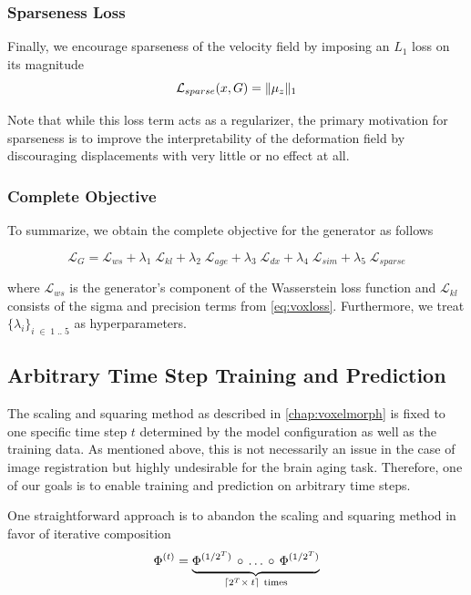 \subsubsection*{Sparseness Loss}
Finally, we encourage sparseness of the velocity field by imposing an $L_1$ loss on its magnitude
\begin{equation}
	\mathcal{L}_{sparse}( x, G ) = \lVert\mu_z\rVert_1
\end{equation}

Note that while this loss term acts as a regularizer, the primary motivation for sparseness is to improve the interpretability of the deformation field by discouraging displacements with very little or no effect at all.

\subsubsection*{Complete Objective}
To summarize, we obtain the complete objective for the generator as follows

\begin{equation}
	\mathcal{L}_G =
		\mathcal{L}_{ws} +
		\lambda_{1} \; \mathcal{L}_{kl} +
		\lambda_{2} \; \mathcal{L}_{age} + 
		\lambda_{3} \; \mathcal{L}_{dx} + 
		\lambda_{4} \; \mathcal{L}_{sim} + 
		\lambda_{5} \; \mathcal{L}_{sparse}
\end{equation}

where $\mathcal{L}_{ws}$ is the generator's component of the Wasserstein loss function and $\mathcal{L}_{kl}$ consists of the sigma and precision terms from \autoref{eq:voxloss}. Furthermore, we treat $ \{ \lambda_i \}_{i\;\in\;1\;..\;5}$ as hyperparameters.

\subsection{Arbitrary Time Step Training and Prediction} \label{sec:adaarbtimestep}
The scaling and squaring method as described in \autoref{chap:voxelmorph} is fixed to one specific time step $t$ determined by the model configuration as well as the training data. As mentioned above, this is not necessarily an issue in the case of image registration but highly undesirable for the brain aging task. Therefore, one of our goals is to enable training and prediction on arbitrary time steps.

One straightforward approach is to abandon the scaling and squaring method in favor of iterative composition
\begin{equation}
	\Phi^{(t)} =
	\underbrace{
		\Phi^{(1 / 2^T)} \, \circ \, \ldots \, \circ \, \Phi^{(1 / 2^T)} \vphantom{\Phi^{(1 / 2^T)}_2}
	}_{\lceil 2^T \times \: t \rceil \ \text{times}}
\end{equation}

